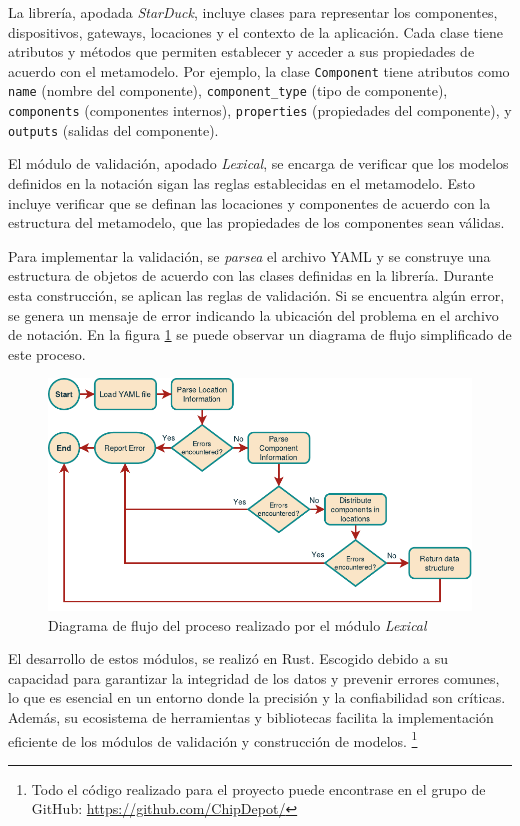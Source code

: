 La librería, apodada \textit{StarDuck}, incluye clases para representar los componentes, dispositivos, gateways, locaciones y el contexto de la aplicación. Cada clase tiene atributos y métodos que permiten establecer y acceder a sus propiedades de acuerdo con el metamodelo. Por ejemplo, la clase \texttt{Component} tiene atributos como \texttt{name} (nombre del componente), \texttt{component\_type} (tipo de componente), \texttt{components} (componentes internos), \texttt{properties} (propiedades del componente), y \texttt{outputs} (salidas del componente).

El módulo de validación, apodado \textit{Lexical}, se encarga de verificar que los modelos definidos en la notación sigan las reglas establecidas en el metamodelo. Esto incluye verificar que se definan las locaciones y componentes de acuerdo con la estructura del metamodelo, que las propiedades de los componentes sean válidas.

Para implementar la validación, se \textit{parsea} el archivo YAML y se construye una estructura de objetos de acuerdo con las clases definidas en la librería. Durante esta construcción, se aplican las reglas de validación. Si se encuentra algún error, se genera un mensaje de error indicando la ubicación del problema en el archivo de notación. En la figura \ref{fig:LexicalFlow} se puede observar un diagrama de flujo simplificado de este proceso.

\begin{figure}[H]
    \centering
    \caption{Diagrama de flujo del proceso realizado por el módulo \textit{Lexical}}
    \label{fig:LexicalFlow}
    \vspace{2mm}
    \includegraphics[width=\linewidth]{images/LexicalFlow.pdf}
\end{figure}

El desarrollo de estos módulos, se realizó en Rust. Escogido debido a su capacidad para garantizar la integridad de los datos y prevenir errores comunes, lo que es esencial en un entorno donde la precisión y la confiabilidad son críticas. Además, su ecosistema de herramientas y bibliotecas facilita la implementación eficiente de los módulos de validación y construcción de modelos. \footnote{Todo el código realizado para el proyecto puede encontrase en el grupo de GitHub: \url{https://github.com/ChipDepot/}}

